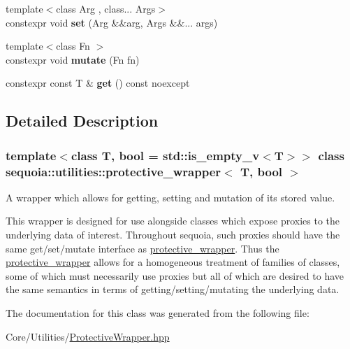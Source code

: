 \begin{DoxyCompactItemize}
{\footnotesize template$<$class Arg , class... Args$>$ }\\constexpr void {\bfseries set} (Arg \&\&arg, Args \&\&... args)
\item 
\mbox{\label{classsequoia_1_1utilities_1_1protective__wrapper_a4d844f4ff80def39faef80441b8d8fe6}} 
{\footnotesize template$<$class Fn $>$ }\\constexpr void {\bfseries mutate} (Fn fn)
\item 
\mbox{\label{classsequoia_1_1utilities_1_1protective__wrapper_ad23e29b565082f9b5336d7bc47026955}} 
constexpr const T \& {\bfseries get} () const noexcept
\end{DoxyCompactItemize}


\subsection{Detailed Description}
\subsubsection*{template$<$class T, bool = std\+::is\+\_\+empty\+\_\+v$<$\+T$>$$>$\newline
class sequoia\+::utilities\+::protective\+\_\+wrapper$<$ T, bool $>$}

A wrapper which allows for getting, setting and mutation of its stored value. 

This wrapper is designed for use alongside classes which expose proxies to the underlying data of interest. Throughout sequoia, such proxies should have the same get/set/mutate interface as \mbox{\hyperlink{classsequoia_1_1utilities_1_1protective__wrapper}{protective\+\_\+wrapper}}. Thus the \mbox{\hyperlink{classsequoia_1_1utilities_1_1protective__wrapper}{protective\+\_\+wrapper}} allows for a homogeneous treatment of families of classes, some of which must necessarily use proxies but all of which are desired to have the same semantics in terms of getting/setting/mutating the underlying data. 

The documentation for this class was generated from the following file\+:\begin{DoxyCompactItemize}
\item 
Core/\+Utilities/\mbox{\hyperlink{_protective_wrapper_8hpp}{Protective\+Wrapper.\+hpp}}\end{DoxyCompactItemize}
